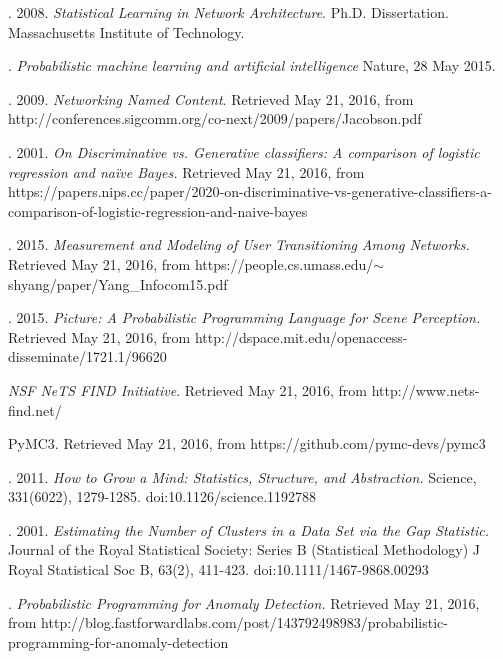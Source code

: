 \documentclass[]{article}
\begin{document}
\begin{thebibliography}{25}

  
 \author{Beverly, Robert}. 2008. {\em Statistical Learning in Network Architecture}. Ph.D. Dissertation. Massachusetts Institute of Technology. 

\author{Zoubin Ghahramani}. {\em Probabilistic machine learning and artificial intelligence} Nature, 28 May 2015.

 \author{Jacobson, Van}. 2009. {\em Networking Named Content}. Retrieved May 21, 2016, from http://conferences.sigcomm.org/co-next/2009/papers/Jacobson.pdf

\author{Ng, Andrew}. 2001. {\em On Discriminative vs. Generative classifiers: A comparison of logistic regression and na{\"i}ve Bayes.} Retrieved May 21, 2016, from https://papers.nips.cc/paper/2020-on-discriminative-vs-generative-classifiers-a-comparison-of-logistic-regression-and-naive-bayes

\author{Yang, Sookhyn}. 2015. {\em  Measurement and Modeling of User Transitioning Among Networks.} Retrieved May 21, 2016, from https://people.cs.umass.edu/$\sim$shyang/paper/Yang\_Infocom15.pdf

 \author{Kulkarni}. 2015. {\em Picture: A Probabilistic Programming Language for Scene Perception.} Retrieved May 21, 2016, from http://dspace.mit.edu/openaccess-disseminate/1721.1/96620

\emph{NSF NeTS FIND Initiative}. Retrieved May 21, 2016, from http://www.nets-find.net/

 PyMC3. Retrieved May 21, 2016, from https://github.com/pymc-devs/pymc3

 \author{Tenenbaum, Joshua. et al}. 2011. {\em How to Grow a Mind: Statistics, Structure, and Abstraction.} Science, 331(6022), 1279-1285. doi:10.1126/science.1192788

 \author{Tibshirani, Robert. et al}. 2001. {\em Estimating the Number of Clusters in a Data Set via the Gap Statistic.} Journal of the Royal Statistical Society: Series B (Statistical Methodology) J Royal Statistical Soc B, 63(2), 411-423. doi:10.1111/1467-9868.00293

 \author{Finkelstein, Noam}. {\em Probabilistic Programming for Anomaly Detection.} Retrieved May 21, 2016, from http://blog.fastforwardlabs.com/post/143792498983/probabilistic-programming-for-anomaly-detection


\end{thebibliography}
\end{document}
